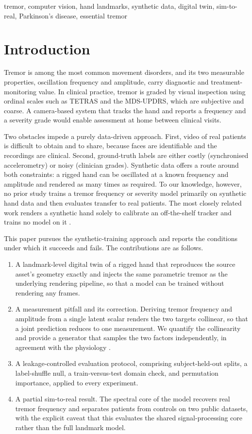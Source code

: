 \documentclass[conference]{IEEEtran}
\begin{document}
\begin{IEEEkeywords}
tremor, computer vision, hand landmarks, synthetic data, digital twin,
sim-to-real, Parkinson's disease, essential tremor
\end{IEEEkeywords}

\section{Introduction}
Tremor is among the most common movement disorders, and its two measurable
properties, oscillation frequency and amplitude, carry diagnostic and
treatment-monitoring value. In clinical practice, tremor is graded by visual
inspection using ordinal scales such as TETRAS and the MDS-UPDRS, which are
subjective and coarse. A camera-based system that tracks the hand and reports a
frequency and a severity grade would enable assessment at home between clinical
visits.

Two obstacles impede a purely data-driven approach. First, video of real patients
is difficult to obtain and to share, because faces are identifiable and the
recordings are clinical. Second, ground-truth labels are either costly
(synchronised accelerometry) or noisy (clinician grades). Synthetic data offers a
route around both constraints: a rigged hand can be oscillated at a known
frequency and amplitude and rendered as many times as required. To our knowledge,
however, no prior study trains a tremor frequency or severity model primarily on
synthetic hand data and then evaluates transfer to real patients. The most closely
related work renders a synthetic hand solely to calibrate an off-the-shelf tracker
and trains no model on it \cite{wolke2025}.

This paper pursues the synthetic-training approach and reports the conditions under
which it succeeds and fails. The contributions are as follows.
\begin{enumerate}
\item A landmark-level digital twin of a rigged hand that reproduces the source
asset's geometry exactly and injects the same parametric tremor as the underlying
rendering pipeline, so that a model can be trained without rendering any frames.
\item A measurement pitfall and its correction. Deriving tremor frequency and
amplitude from a single latent scalar renders the two targets collinear, so that a
joint prediction reduces to one measurement. We quantify the collinearity and
provide a generator that samples the two factors independently, in agreement with
the physiology \cite{pan2025}.
\item A leakage-controlled evaluation protocol, comprising subject-held-out
splits, a label-shuffle null, a train-versus-test domain check, and permutation
importance, applied to every experiment.
\item A partial sim-to-real result. The spectral core of the model recovers real
tremor frequency and separates patients from controls on two public datasets, with
the explicit caveat that this evaluates the shared signal-processing core rather
than the full landmark model.
\end{enumerate}
\end{document}

